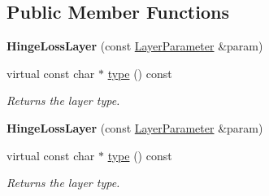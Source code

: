 \subsection*{Public Member Functions}
\begin{DoxyCompactItemize}
\item 
\mbox{\label{classcaffe_1_1_hinge_loss_layer_a358a5bd2625bb7fed61052dd8e1cb588}} 
{\bfseries Hinge\+Loss\+Layer} (const \mbox{\hyperlink{classcaffe_1_1_layer_parameter}{Layer\+Parameter}} \&param)
\item 
\mbox{\label{classcaffe_1_1_hinge_loss_layer_a9bee53540accf1ad93e68bfcf0302c1f}} 
virtual const char $\ast$ \mbox{\hyperlink{classcaffe_1_1_hinge_loss_layer_a9bee53540accf1ad93e68bfcf0302c1f}{type}} () const
\begin{DoxyCompactList}\small\item\em Returns the layer type. \end{DoxyCompactList}\item 
\mbox{\label{classcaffe_1_1_hinge_loss_layer_a358a5bd2625bb7fed61052dd8e1cb588}} 
{\bfseries Hinge\+Loss\+Layer} (const \mbox{\hyperlink{classcaffe_1_1_layer_parameter}{Layer\+Parameter}} \&param)
\item 
\mbox{\label{classcaffe_1_1_hinge_loss_layer_a9bee53540accf1ad93e68bfcf0302c1f}} 
virtual const char $\ast$ \mbox{\hyperlink{classcaffe_1_1_hinge_loss_layer_a9bee53540accf1ad93e68bfcf0302c1f}{type}} () const
\begin{DoxyCompactList}\small\item\em Returns the layer type. \end{DoxyCompactList}\end{DoxyCompactItemize}

